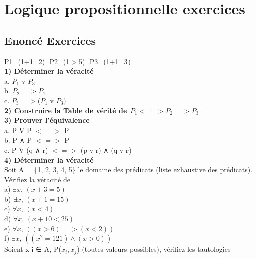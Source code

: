 \newpage

\chapter{Logique propositionnelle exercices}
\vspace{5mm} %

\section{Enoncé Exercices}

P1=(1+1=2) $ $ P2=(1$>$5) $ $ P3=(1+1=3) \\


\textbf{1) Déterminer la véracité} \\

a. $P_1$ v $P_3$ \\
b. $P_2 => P_1$ \\
c. $P_3 => (P_1$ v $P_3)$ \\

\vspace{3mm}
\textbf{2) Construire la Table de vérité de $P_1 <=> P_2 => P_3$} \\

\vspace{3mm}
\textbf{3) Prouver l'équivalence} \\

a. P V P $<=>$ P \\
b. P ∧ P  $<=>$ P \\
c. P V (q ∧ r) $<=>$ (p v r) ∧ (q v r) \\

\vspace{3mm}
\textbf{4) Déterminer la véracité} \\

Soit A = \{1, 2, 3, 4, 5\} le domaine des prédicats (liste exhaustive des prédicats). Vérifiez la véracité de \\

a) $∃x$, $(x + 3 = 5)$ \\
b) $∃x$, $(x + 1 = 15)$ \\
c) $∀x$, $(x < 4)$ \\
d) $∀x$, $(x + 10 < 25)$ \\
e) $∀x$, $((x > 6) => (x < 2))$ \\
f) $∃x$, $((x^{2} = 121) ∧ (x > 0))$ \\

Soient x i ∈ A, P($x_{i}, x_{j}$) (toutes valeurs possibles), vérifiez les tautologies

